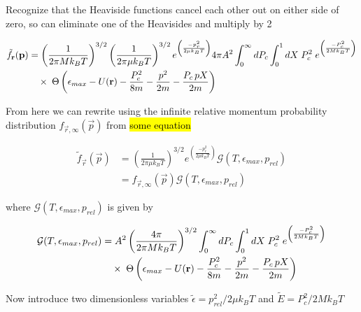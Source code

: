 Recognize that the Heaviside functions cancel each other out on either side of zero, so can eliminate one of the Heavisides and multiply by 2

\begin{equation}
\begin{split}
	 \tilde{f}_{\mathbf{r}}(\mathbf{p}) &= \left(\frac{1}{2 \pi M k_B T}\right)^{3/2} \left(\frac{1}{2 \pi \mu k_B T}\right)^{3/2} e^{\left(\frac{-p_r^2}{2 \mu k_B T}\right)} 4 \pi A^2 \int_0^{\infty} dP_c \int_0^1 dX \; P_c^2 \; e^{\left(\frac{-P_c^2}{2 M k_B T}\right)} \\ 
	 &\quad \times \; \Theta \left( {\epsilon_{max} - U(\mathbf{r}) - \frac{P_c^2}{8m} - \frac{p^2}{2m} - \frac{P_c \, p X}{2m}} \right) 
\end{split}
\end{equation}

From here we can rewrite using the infinite relative momentum probability distribution $f_{\vec{r}, \infty} (\vec{p})$ from \hl{some equation}

\begin{equation}
\begin{split}
	 \tilde{f}_{\vec{r}}(\vec{p}) &= \left(\frac{1}{2 \pi \mu k_B T}\right)^{3/2} e^{\left(\frac{-p_r^2}{2 \mu k_B T}\right)} \mathcal{G}(T, \epsilon_{max}, p_{rel}) \\
	 &= f_{\vec{r}, \infty} (\vec{p}) \mathcal{G}(T, \epsilon_{max}, p_{rel})
\end{split}
\end{equation}

where $\mathcal{G}(T, \epsilon_{max}, p_{rel})$ is given by

\begin{equation}
\begin{split}
	\mathcal{G}(T, \epsilon_{max}, p_{rel}) &= A^2 \left(\frac{4 \pi}{2 \pi M k_B T}\right)^{3/2} \int_0^{\infty} dP_c \int_0^1 dX \; P_c^2 \; e^{\left(\frac{-P_c^2}{2 M k_B T}\right)} \\ 
	 &\quad \times \; \Theta \left( {\epsilon_{max} - U(\mathbf{r}) - \frac{P_c^2}{8m} - \frac{p^2}{2m} - \frac{P_c \, p X}{2m}} \right) 
\end{split}
\end{equation}

Now introduce two dimensionless variables $\tilde{\epsilon} = p_{rel}^2/2 \mu k_B T$ and $\tilde{E} = P_c^2/2 M k_B T$